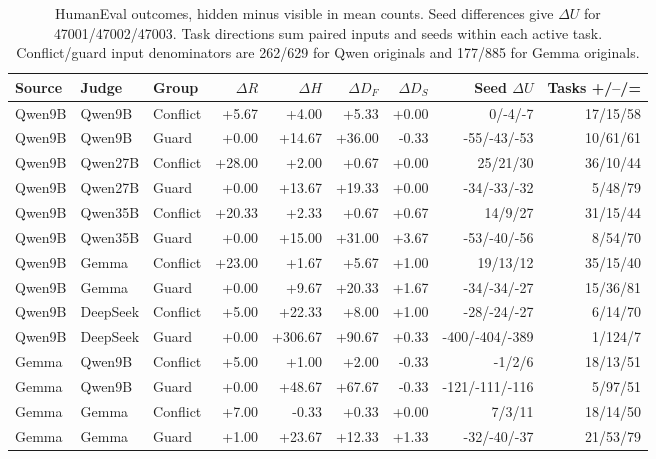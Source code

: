 \begin{table}[t]
\centering
\small
\caption{HumanEval outcomes, hidden minus visible in mean counts. Seed differences give $\Delta U$ for 47001/47002/47003. Task directions sum paired inputs and seeds within each active task. Conflict/guard input denominators are 262/629 for Qwen originals and 177/885 for Gemma originals.}
\label{tab:s_decomposition}
\begin{tabular}{lllrrrrrr}
\toprule
Source & Judge & Group & $\Delta R$ & $\Delta H$ & $\Delta D_F$ & $\Delta D_S$ & Seed $\Delta U$ & Tasks +/--/= \\
\midrule
Qwen9B & Qwen9B & Conflict & +5.67 & +4.00 & +5.33 & +0.00 & 0/-4/-7 & 17/15/58 \\
Qwen9B & Qwen9B & Guard & +0.00 & +14.67 & +36.00 & -0.33 & -55/-43/-53 & 10/61/61 \\
Qwen9B & Qwen27B & Conflict & +28.00 & +2.00 & +0.67 & +0.00 & 25/21/30 & 36/10/44 \\
Qwen9B & Qwen27B & Guard & +0.00 & +13.67 & +19.33 & +0.00 & -34/-33/-32 & 5/48/79 \\
Qwen9B & Qwen35B & Conflict & +20.33 & +2.33 & +0.67 & +0.67 & 14/9/27 & 31/15/44 \\
Qwen9B & Qwen35B & Guard & +0.00 & +15.00 & +31.00 & +3.67 & -53/-40/-56 & 8/54/70 \\
Qwen9B & Gemma & Conflict & +23.00 & +1.67 & +5.67 & +1.00 & 19/13/12 & 35/15/40 \\
Qwen9B & Gemma & Guard & +0.00 & +9.67 & +20.33 & +1.67 & -34/-34/-27 & 15/36/81 \\
Qwen9B & DeepSeek & Conflict & +5.00 & +22.33 & +8.00 & +1.00 & -28/-24/-27 & 6/14/70 \\
Qwen9B & DeepSeek & Guard & +0.00 & +306.67 & +90.67 & +0.33 & -400/-404/-389 & 1/124/7 \\
Gemma & Qwen9B & Conflict & +5.00 & +1.00 & +2.00 & -0.33 & -1/2/6 & 18/13/51 \\
Gemma & Qwen9B & Guard & +0.00 & +48.67 & +67.67 & -0.33 & -121/-111/-116 & 5/97/51 \\
Gemma & Gemma & Conflict & +7.00 & -0.33 & +0.33 & +0.00 & 7/3/11 & 18/14/50 \\
Gemma & Gemma & Guard & +1.00 & +23.67 & +12.33 & +1.33 & -32/-40/-37 & 21/53/79 \\
\bottomrule
\end{tabular}
\end{table}
